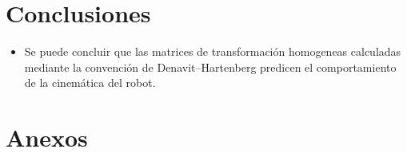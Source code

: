 \documentclass[12pt]{article}
\begin{document}
\section{Conclusiones}
\begin{itemize}
    \item Se puede concluir que las matrices de transformación homogeneas calculadas mediante la convención de Denavit–Hartenberg predicen el comportamiento de la cinemática del robot.
\end{itemize}


\section{Anexos}

\end{document}
